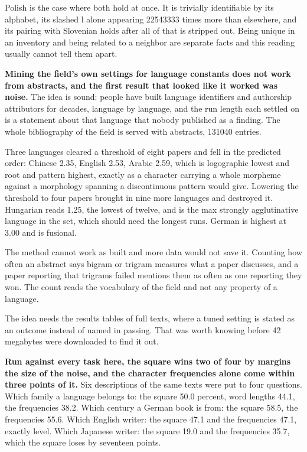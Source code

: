 Polish is the case where both hold at once. It is trivially identifiable by its alphabet, its slashed l alone appearing 22543333 times more than elsewhere, and its pairing with Slovenian holds after all of that is stripped out. Being unique in an inventory and being related to a neighbor are separate facts and this reading usually cannot tell them apart.

\textbf{Mining the field's own settings for language constants does not work from abstracts, and the first result that looked like it worked was noise.} The idea is sound: people have built language identifiers and authorship attributors for decades, language by language, and the run length each settled on is a statement about that language that nobody published as a finding. The whole bibliography of the field is served with abstracts, 131040 entries.

Three languages cleared a threshold of eight papers and fell in the predicted order: Chinese 2.35, English 2.53, Arabic 2.59, which is logographic lowest and root and pattern highest, exactly as a character carrying a whole morpheme against a morphology spanning a discontinuous pattern would give. Lowering the threshold to four papers brought in nine more languages and destroyed it. Hungarian reads 1.25, the lowest of twelve, and is the max strongly agglutinative language in the set, which should need the longest runs. German is highest at 3.00 and is fusional.

The method cannot work as built and more data would not save it. Counting how often an abstract says bigram or trigram measures what a paper discusses, and a paper reporting that trigrams failed mentions them as often as one reporting they won. The count reads the vocabulary of the field and not any property of a language.

The idea needs the results tables of full texts, where a tuned setting is stated as an outcome instead of named in passing. That was worth knowing before 42 megabytes were downloaded to find it out.

\textbf{Run against every task here, the square wins two of four by margins the size of the noise, and the character frequencies alone come within three points of it.} Six descriptions of the same texts were put to four questions. Which family a language belongs to: the square 50.0 percent, word lengths 44.1, the frequencies 38.2. Which century a German book is from: the square 58.5, the frequencies 55.6. Which English writer: the square 47.1 and the frequencies 47.1, exactly level. Which Japanese writer: the square 19.0 and the frequencies 35.7, which the square loses by seventeen points.

